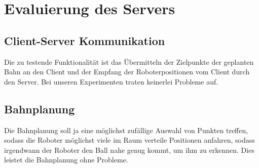 \section{Evaluierung des Servers}
\label{sec:eval-des-serv}
%

%
\subsection{Client-Server Kommunikation}
Die zu testende Funktionalität ist das Übermitteln der Zielpunkte der
geplanten Bahn an den Client und der Empfang der Roboterpositionen vom
Client durch den Server. Bei unseren Experimenten traten keinerlei
Probleme auf. 
\subsection{Bahnplanung}
Die Bahnplanung soll ja eine möglichst zufällige Auswahl von Punkten
treffen, sodass die Roboter möglichst viele im Raum verteile
Positionen anfahren, sodass irgendwann der Roboter den Ball nahe genug
kommt, um ihm zu erkennen. Dies leistet die Bahnplanung ohne Probleme.

